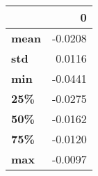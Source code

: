 \begin{tabular}{lr}
\toprule
{} &       0 \\
\midrule
\textbf{mean} & -0.0208 \\
\textbf{std } &  0.0116 \\
\textbf{min } & -0.0441 \\
\textbf{25\% } & -0.0275 \\
\textbf{50\% } & -0.0162 \\
\textbf{75\% } & -0.0120 \\
\textbf{max } & -0.0097 \\
\bottomrule
\end{tabular}
